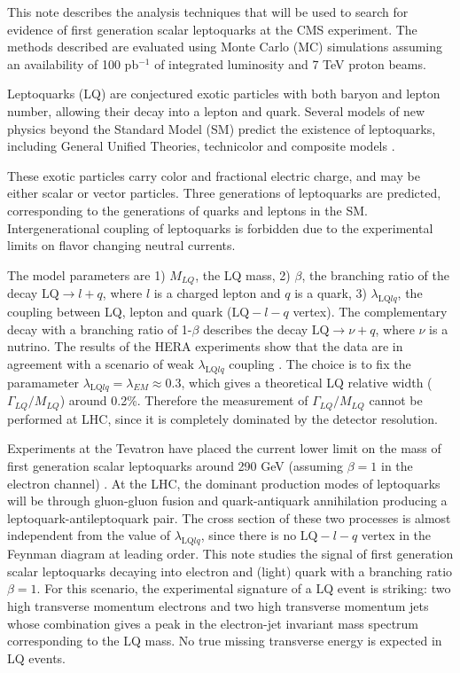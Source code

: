 This note describes the analysis techniques that will be used to search for evidence of first generation scalar leptoquarks 
at the CMS experiment. The methods described are evaluated using Monte Carlo (MC) simulations assuming an availability of 
100 pb$^{-1}$ of integrated luminosity and 7 TeV proton beams.

Leptoquarks (LQ) are conjectured exotic particles with both baryon and lepton number, allowing their decay into a lepton and quark.    
Several models of new physics beyond the Standard Model (SM) predict the existence of leptoquarks, including General Unified Theories, 
technicolor and composite models \cite{theories}.  

These exotic particles carry color and fractional electric 
charge, and may be either scalar or vector particles. Three generations of leptoquarks are predicted, 
corresponding to the generations of quarks and leptons in the SM.  Intergenerational coupling of leptoquarks is forbidden 
due to the experimental limits on flavor changing neutral currents. 

The model parameters are 1) $M_{LQ}$, the LQ mass, 2) $\beta$, the branching ratio of the decay 
$\mbox{LQ} \rightarrow l + q$, where $l$ is a charged lepton and $q$ is a quark, 
3) $\lambda_{\mbox{LQ}lq}$, the coupling between LQ, lepton and quark ($\mbox{LQ}-l-q$ vertex). 
The complementary decay with a branching ratio of 1-$\beta$ describes the decay $\mbox{LQ} \rightarrow \nu + q$, 
where $\nu$ is a nutrino.
The results of the HERA experiments show that the data are in agreement with a scenario of weak 
$\lambda_{\mbox{LQ}lq}$ coupling \cite{hera}. The choice is to fix the paramameter 
$\lambda_{\mbox{LQ}lq} = \lambda_{EM} \approx 0.3$, which gives 
a theoretical LQ relative width ($\Gamma_{LQ}/M_{LQ}$) around 0.2\%. 
Therefore the measurement of $\Gamma_{LQ}/M_{LQ}$ cannot be performed at LHC, since 
it is completely dominated by the detector resolution.  

Experiments at the Tevatron have placed the current lower limit on the mass of first generation scalar 
leptoquarks around 290 GeV (assuming $\beta=1$ in the electron channel) \cite{d02008}.
At the LHC, the dominant production modes of leptoquarks will be through gluon-gluon fusion and 
quark-antiquark annihilation producing a leptoquark-antileptoquark pair. 
The cross section of these two processes is almost independent from the value of 
$\lambda_{\mbox{LQ}lq}$, since there is no $\mbox{LQ}-l-q$ vertex in the Feynman diagram 
at leading order. This note studies the signal of first generation scalar leptoquarks decaying into electron and 
(light) quark with a branching ratio $\beta=1$. 
For this scenario, the experimental signature of a LQ event is striking: two 
high transverse momentum electrons and two high transverse momentum jets 
whose combination gives a peak in the electron-jet invariant mass 
spectrum corresponding to the LQ mass. No true missing transverse energy is expected in LQ events.

